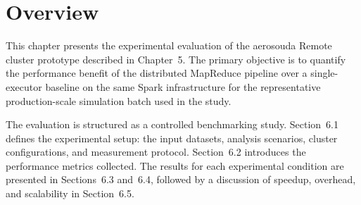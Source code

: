 


\section{Overview}
\label{sec:eval-overview}

This chapter presents the experimental evaluation of the \gls{aerosouda} Remote cluster 
prototype described in Chapter~5. The primary objective is to quantify the performance
benefit of the distributed MapReduce pipeline over a single-executor baseline on the same
Spark infrastructure for the representative production-scale simulation batch used in the
study.

The evaluation is structured as a controlled benchmarking study.  Section~6.1 defines the
experimental setup: the input datasets, analysis scenarios, cluster configurations, and
measurement protocol.  Section~6.2 introduces the performance metrics collected.  The results
for each experimental condition are presented in Sections~6.3 and~6.4, followed by a
discussion of speedup, overhead, and scalability in Section~6.5.

